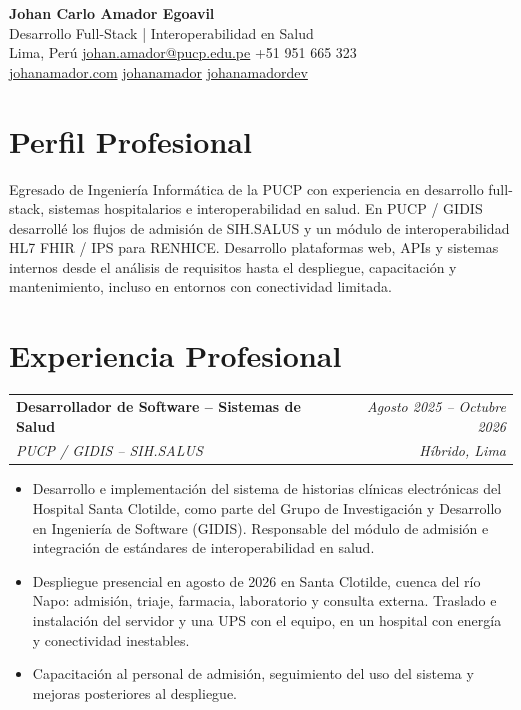 \documentclass[a4paper,10pt]{article}
\makeatletter
\newcommand{\cvsubheading}[4]{
  \vspace{2pt}
  \begin{tabularx}{\textwidth}{@{}X r@{}}
    \textbf{#1} & \textit{\small #2} \\
    \textit{\small\color{graytext} #3} & \textit{\small\color{graytext} #4} \\
  \end{tabularx}\vspace{-2pt}
}
\makeatother
\begin{document}
\begin{center}
  {\LARGE\bfseries Johan Carlo Amador Egoavil} \\[3pt]
  {\small\color{graytext} Desarrollo Full-Stack | Interoperabilidad en Salud} \\[6pt]
  \small
  \enspace Lima, Per\'u \quad
  \enspace \href{mailto:johan.amador@pucp.edu.pe}{johan.amador@pucp.edu.pe} \quad
  \enspace +51 951 665 323 \\[3pt]
  \enspace \href{https://johanamador.com}{johanamador.com} \quad
  \enspace \href{https://github.com/johanamador}{johanamador} \quad
  \enspace \href{https://www.linkedin.com/in/johanamadordev/}{johanamadordev}
\end{center}

\section{Perfil Profesional}
Egresado de Ingeniería Informática de la PUCP con experiencia en desarrollo full-stack, sistemas hospitalarios e interoperabilidad en salud. En PUCP / GIDIS desarrollé los flujos de admisión de SIH.SALUS y un módulo de interoperabilidad HL7 FHIR / IPS para RENHICE. Desarrollo plataformas web, APIs y sistemas internos desde el análisis de requisitos hasta el despliegue, capacitación y mantenimiento, incluso en entornos con conectividad limitada.

\section{Experiencia Profesional}

\cvsubheading
  {Desarrollador de Software -- Sistemas de Salud}{Agosto 2025 -- Octubre 2026}
  {PUCP / GIDIS -- SIH.SALUS}{H\'ibrido, Lima}
\begin{itemize}[leftmargin=16pt, itemsep=1.5pt, parsep=0pt, topsep=3pt]
  \item Desarrollo e implementaci\'on del sistema de historias cl\'inicas electr\'onicas del Hospital Santa Clotilde, como parte del Grupo de Investigaci\'on y Desarrollo en Ingenier\'ia de Software (GIDIS). Responsable del m\'odulo de admisi\'on e integraci\'on de est\'andares de interoperabilidad en salud.
  \item Despliegue presencial en agosto de 2026 en Santa Clotilde, cuenca del r\'io Napo: admisi\'on, triaje, farmacia, laboratorio y consulta externa. Traslado e instalaci\'on del servidor y una UPS con el equipo, en un hospital con energ\'ia y conectividad inestables.
  \item Capacitaci\'on al personal de admisi\'on, seguimiento del uso del sistema y mejoras posteriores al despliegue.
\end{itemize}
\end{document}
